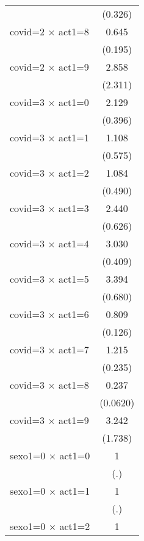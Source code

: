 {\begin{tabular}{l*{1}{c}}
                    &     (0.326)         \\
[1em]
covid=2 $\times$ act1=8&       0.645         \\
                    &     (0.195)         \\
[1em]
covid=2 $\times$ act1=9&       2.858         \\
                    &     (2.311)         \\
[1em]
covid=3 $\times$ act1=0&       2.129\sym{***}\\
                    &     (0.396)         \\
[1em]
covid=3 $\times$ act1=1&       1.108         \\
                    &     (0.575)         \\
[1em]
covid=3 $\times$ act1=2&       1.084         \\
                    &     (0.490)         \\
[1em]
covid=3 $\times$ act1=3&       2.440\sym{***}\\
                    &     (0.626)         \\
[1em]
covid=3 $\times$ act1=4&       3.030\sym{***}\\
                    &     (0.409)         \\
[1em]
covid=3 $\times$ act1=5&       3.394\sym{***}\\
                    &     (0.680)         \\
[1em]
covid=3 $\times$ act1=6&       0.809         \\
                    &     (0.126)         \\
[1em]
covid=3 $\times$ act1=7&       1.215         \\
                    &     (0.235)         \\
[1em]
covid=3 $\times$ act1=8&       0.237\sym{***}\\
                    &    (0.0620)         \\
[1em]
covid=3 $\times$ act1=9&       3.242\sym{*}  \\
                    &     (1.738)         \\
[1em]
sexo1=0 $\times$ act1=0&           1         \\
                    &         (.)         \\
[1em]
sexo1=0 $\times$ act1=1&           1         \\
                    &         (.)         \\
[1em]
sexo1=0 $\times$ act1=2&           1         \\

\end{tabular}}
